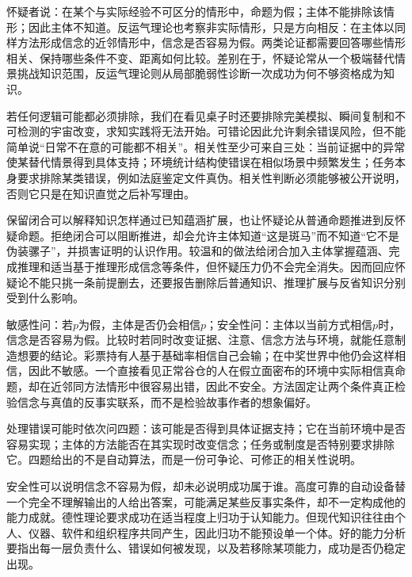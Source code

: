 怀疑者说：在某个与实际经验不可区分的情形中，命题为假；主体不能排除该情形；因此主体不知道。反运气理论也考察非实际情形，只是方向相反：在主体以同样方法形成信念的近邻情形中，信念是否容易为假。两类论证都需要回答哪些情形相关、保持哪些条件不变、距离如何比较。差别在于，怀疑论常从一个极端替代情景挑战知识范围，反运气理论则从局部脆弱性诊断一次成功为何不够资格成为知识。

若任何逻辑可能都必须排除，我们在看见桌子时还要排除完美模拟、瞬间复制和不可检测的宇宙改变，求知实践将无法开始。可错论因此允许剩余错误风险，但不能简单说“日常不在意的可能都不相关”。相关性至少可来自三处：当前证据中的异常使某替代情景得到具体支持；环境统计结构使错误在相似场景中频繁发生；任务本身要求排除某类错误，例如法庭鉴定文件真伪。相关性判断必须能够被公开说明，否则它只是在知识直觉之后补写理由。

保留闭合可以解释知识怎样通过已知蕴涵扩展，也让怀疑论从普通命题推进到反怀疑命题。拒绝闭合可以阻断推进，却会允许主体知道“这是斑马”而不知道“它不是伪装骡子”，并损害证明的认识作用。较温和的做法给闭合加入主体掌握蕴涵、完成推理和适当基于推理形成信念等条件，但怀疑压力仍不会完全消失。因而回应怀疑论不能只挑一条前提删去，还要报告删除后普通知识、推理扩展与反省知识分别受到什么影响。

敏感性问：若$p$为假，主体是否仍会相信$p$；安全性问：主体以当前方式相信$p$时，信念是否容易为假。比较时若同时改变证据、注意、信念方法与环境，就能任意制造想要的结论。彩票持有人基于基础率相信自己会输；在中奖世界中他仍会这样相信，因此不敏感。一个直接看见正常谷仓的人在假立面密布的环境中实际相信真命题，却在近邻同方法情形中很容易出错，因此不安全。方法固定让两个条件真正检验信念与真值的反事实联系，而不是检验故事作者的想象偏好。

\begin{argumentbox}
处理错误可能时依次问四题：该可能是否得到具体证据支持；它在当前环境中是否容易实现；主体的方法能否在其实现时改变信念；任务或制度是否特别要求排除它。四题给出的不是自动算法，而是一份可争论、可修正的相关性说明。
\end{argumentbox}

安全性可以说明信念不容易为假，却未必说明成功属于谁。高度可靠的自动设备替一个完全不理解输出的人给出答案，可能满足某些反事实条件，却不一定构成他的能力成就。德性理论要求成功在适当程度上归功于认知能力\parencite{sosa2007,zagzebski1996}。但现代知识往往由个人、仪器、软件和组织程序共同产生，因此归功不能预设单一个体。好的能力分析要指出每一层负责什么、错误如何被发现，以及若移除某项能力，成功是否仍稳定出现。

